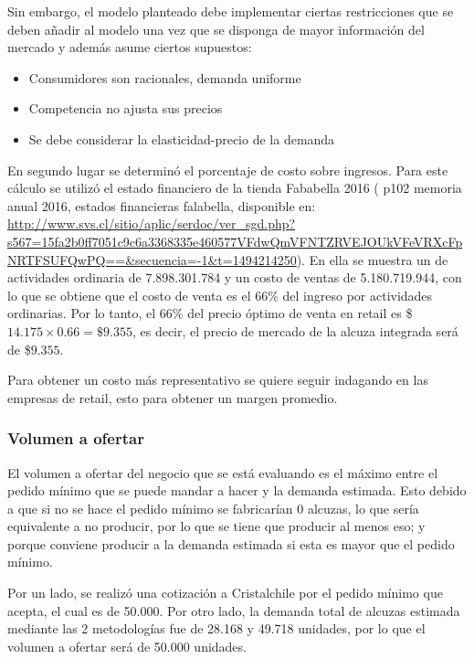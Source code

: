 Sin embargo, el modelo planteado debe implementar ciertas restricciones que se deben añadir al modelo una vez que se disponga de mayor información del mercado y además asume ciertos supuestos:
\begin{itemize}
\item Consumidores son racionales, demanda uniforme
\item Competencia no ajusta sus precios
\item Se debe considerar la elasticidad-precio de la demanda
\end{itemize}


En segundo lugar se determinó el porcentaje de costo sobre ingresos. Para este cálculo se utilizó el estado financiero de la tienda Fababella 2016 ( p102 memoria anual 2016, estados financieras falabella, disponible en: \url{http://www.svs.cl/sitio/aplic/serdoc/ver_sgd.php?s567=15fa2b0ff7051c9c6a3368335e460577VFdwQmVFNTZRVEJOUkVFeVRXcFpNRTFSUFQwPQ==&secuencia=-1&t=1494214250}). En ella se muestra un de actividades ordinaria de 7.898.301.784 y un costo de ventas de 5.180.719.944, con lo que se obtiene que el costo de venta es el 66\% del ingreso por actividades ordinarias. Por lo tanto, el 66\% del precio óptimo de venta en retail es
\$$14.175 \times 0.66=\$9.355$, es decir, el precio de mercado de la alcuza integrada será de \$$9.355$.

Para obtener un costo más representativo se quiere seguir indagando en las empresas de retail, esto para obtener un margen promedio.

\subsubsection{Volumen a ofertar}

El volumen a ofertar del negocio que se está evaluando es el máximo entre el pedido mínimo que se puede mandar a hacer y la demanda estimada. Esto debido a que si no se hace el pedido mínimo se fabricarían 0 alcuzas, lo que sería equivalente a no producir, por lo que se tiene que producir al menos eso; y porque conviene producir a la demanda estimada si esta es mayor que el pedido mínimo.

Por un lado, se realizó una cotización a Cristalchile por el pedido mínimo que acepta, el cual es de 50.000. Por otro lado, la demanda total de alcuzas estimada mediante las 2 metodologías fue de 28.168 y 49.718 unidades, por lo que el volumen a ofertar será de 50.000 unidades.
